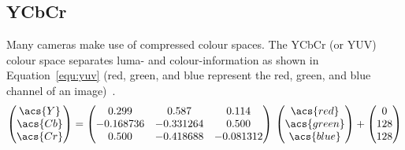 \documentclass[12pt,a4paper,oneside,openright]{book}
\newcommand{\equ}[1]{Equation~\ref{equ:#1}}
\begin{document}
\begin{CJK}{UTF8}{}
\subsection{\acs{Y}\acs{Cb}\acs{Cr}}\label{cha:yuv}
Many cameras make use of compressed colour spaces. The \acs{Y}\acs{Cb}\acs{Cr} (or \acs{Y}\acs{U}\acs{V}) colour space separates luma- and colour-information as shown in \equ{yuv} (\acs{red}, \acs{green}, and \acs{blue} represent the red, green, and blue channel of an image)~\citep{fourcc}.
\begin{equation}\label{equ:yuv}
  \begin{pmatrix}\acs{Y}\\\acs{Cb}\\\acs{Cr}\end{pmatrix}=
  \begin{pmatrix}0.299&0.587&0.114\\
    -0.168736&-0.331264&0.500\\
    0.500&-0.418688&-0.081312
  \end{pmatrix}\,
  \begin{pmatrix}\acs{red}\\\acs{green}\\\acs{blue}\end{pmatrix}+
  \begin{pmatrix}0\\128\\128\end{pmatrix}
\end{equation}


\end{CJK}
\end{document}
